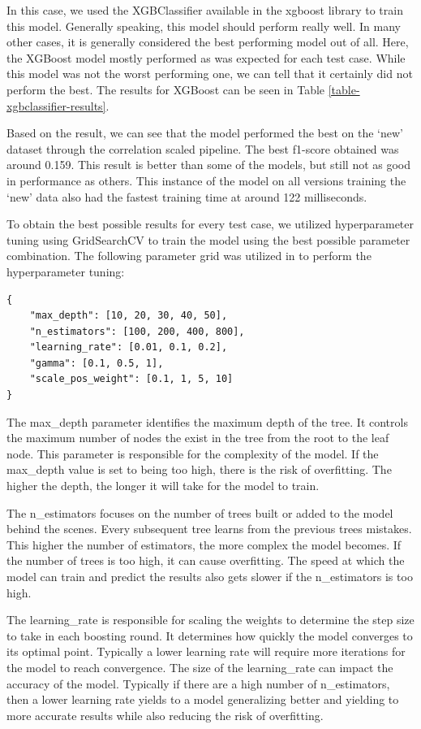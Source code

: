 \documentclass[journal]{IEEEtran}
\begin{document}
In this case, we used the XGBClassifier available in the xgboost library to train this model. Generally speaking, this model should perform really well. In many other cases, it is generally considered the best performing model out of all. Here, the XGBoost model mostly performed as was expected for each test case. While this model was not the worst performing one, we can tell that it certainly did not perform the best. The results for XGBoost can be seen in Table \ref{table-xgbclassifier-results}.



Based on the result, we can see that the model performed the best on the `new' dataset through the correlation scaled pipeline. The best f1-score obtained was around 0.159. This result is better than some of the models, but still not as good in performance as others. This instance of the model on all versions training the `new' data also had the fastest training time at around 122 milliseconds.

To obtain the best possible results for every test case, we utilized hyperparameter tuning using GridSearchCV to train the model using the best possible parameter combination. The following parameter grid was utilized in to perform the hyperparameter tuning:

\begin{lstlisting}
{
    "max_depth": [10, 20, 30, 40, 50],
    "n_estimators": [100, 200, 400, 800],
    "learning_rate": [0.01, 0.1, 0.2],
    "gamma": [0.1, 0.5, 1],
    "scale_pos_weight": [0.1, 1, 5, 10]
}
\end{lstlisting}

The max\_depth parameter identifies the maximum depth of the tree. It controls the maximum number of nodes the exist in the tree from the root to the leaf node. This parameter is responsible for the complexity of the model. If the max\_depth value is set to being too high, there is the risk of overfitting. The higher the depth, the longer it will take for the model to train.

The n\_estimators focuses on the number of trees built or added to the model behind the scenes. Every subsequent tree learns from the previous trees mistakes. This higher the number of estimators, the more complex the model becomes. If the number of trees is too high, it can cause overfitting. The speed at which the model can train and predict the results also gets slower if the n\_estimators is too high. 

The learning\_rate is responsible for scaling the weights to determine the step size to take in each boosting round. It determines how quickly the model converges to its optimal point. Typically a lower learning rate will require more iterations for the model to reach convergence. The size of the learning\_rate can impact the accuracy of the model. Typically if there are a high number of n\_estimators, then a lower learning rate yields to a model generalizing better and yielding to more accurate results while also reducing the risk of overfitting. 
\end{document}
